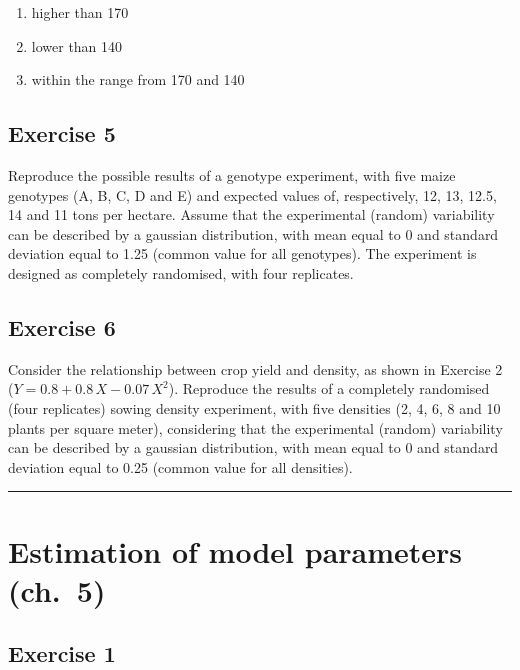 \documentclass[a4paper,12pt,oneside]{book}
\providecommand{\tightlist}{%
  \setlength{\itemsep}{0pt}\setlength{\parskip}{0pt}}
\begin{document}
\begin{enumerate}
\def\labelenumi{\arabic{enumi}.}
\tightlist
\item
  higher than 170
\item
  lower than 140
\item
  within the range from 170 and 140
\end{enumerate}

\hypertarget{exercise-5}{%
\subsection{Exercise 5}\label{exercise-5}}

Reproduce the possible results of a genotype experiment, with five maize genotypes (A, B, C, D and E) and expected values of, respectively, 12, 13, 12.5, 14 and 11 tons per hectare. Assume that the experimental (random) variability can be described by a gaussian distribution, with mean equal to 0 and standard deviation equal to 1.25 (common value for all genotypes). The experiment is designed as completely randomised, with four replicates.

\hypertarget{exercise-6}{%
\subsection{Exercise 6}\label{exercise-6}}

Consider the relationship between crop yield and density, as shown in Exercise 2 (\(Y = 0.8 + 0.8 \, X - 0.07 \, X^2\)). Reproduce the results of a completely randomised (four replicates) sowing density experiment, with five densities (2, 4, 6, 8 and 10 plants per square meter), considering that the experimental (random) variability can be described by a gaussian distribution, with mean equal to 0 and standard deviation equal to 0.25 (common value for all densities).

\begin{center}\rule{0.5\linewidth}{0.5pt}\end{center}

\hypertarget{estimation-of-model-parameters-ch.-5}{%
\section{Estimation of model parameters (ch.~5)}\label{estimation-of-model-parameters-ch.-5}}

\hypertarget{exercise-1-2}{%
\subsection{Exercise 1}\label{exercise-1-2}}
\end{document}
